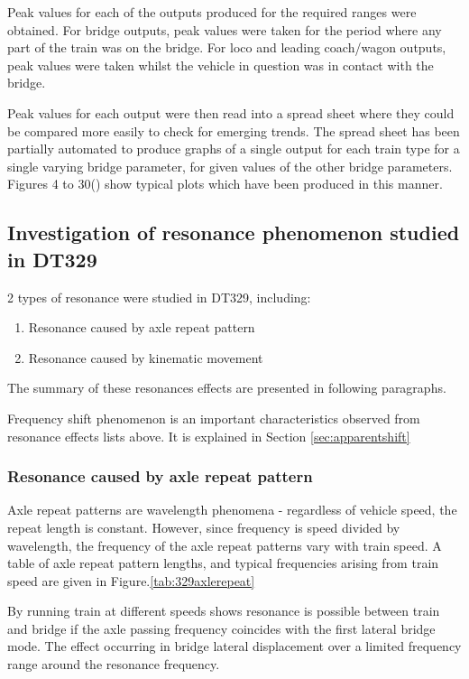 Peak values for each of the outputs produced for the required ranges were obtained. For bridge outputs, peak values were taken for the period where any part of the train was on the bridge. For loco and leading coach/wagon outputs, peak values were taken whilst the vehicle in question was in contact with the bridge.

Peak values for each output were then read into a spread sheet where they could be compared more easily to check for emerging trends. The spread sheet has been partially automated to produce graphs of a single output for each train type for a single varying bridge parameter, for given values of the other bridge parameters. Figures 4 to 30(\cite{d181dt329}) show typical plots which have been produced in this manner.

\subsection{Investigation of resonance phenomenon studied in DT329}\label{sec:resonance329}

2 types of resonance were studied in DT329, including:

\begin{enumerate}
    \item Resonance caused by axle repeat pattern
    \item Resonance caused by kinematic movement
\end{enumerate}

The summary of these resonances effects are presented in following paragraphs. 

Frequency shift phenomenon is an important characteristics observed from resonance effects lists above. It is explained in Section \ref{sec:apparentshift}

\subsubsection{Resonance caused by axle repeat pattern}

Axle repeat patterns are wavelength phenomena - regardless of vehicle speed, the repeat length is constant. However, since frequency is speed divided by wavelength, the frequency of the axle repeat patterns vary with train speed. A table of axle repeat pattern lengths, and typical frequencies arising from train speed are given in Figure.\ref{tab:329axlerepeat}

By running train at different speeds shows resonance is possible between train and bridge if the axle passing frequency coincides with the first lateral bridge mode. The effect occurring in bridge lateral displacement over a limited frequency range around the resonance frequency.


